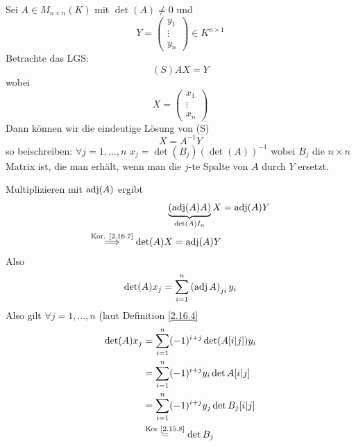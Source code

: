 \begin{subtheorem}
	Sei $ A \in M_{n \times n} (K) $ mit $ \det(A) \neq 0 $ 
	und
	\[
		Y = \begin{pmatrix} y_1 \\ \vdots \\ y_n \end{pmatrix} \in K^{n \times 1} 
	\]
	Betrachte das LGS:
	\[
		(S) AX = Y
	\]
	wobei
	\[
		X = \begin{pmatrix} x_1 \\ \vdots \\ x_n \end{pmatrix} 
	\]
	Dann können wir die eindeutige Lösung von (S)
	\[
		X = A^{-1} Y
	\]
	so beischreiben:
	$ \forall j = 1, \dotsc, n $ $ x_j = \det\left( B_j \right) \left( \det(A) \right) ^{-1}  $ 
	wobei $ B_j $ die $ n \times n $ Matrix ist, die man erhält, wenn man die $ j $-te Spalte von $ A $ durch $ Y $ ersetzt.
\end{subtheorem}
\begin{subproof*}
	Multiplizieren mit $ \operatorname{adj}(A) $ ergibt
	\begin{align*}
		\underbrace{\left( \operatorname{adj}(A) A \right)}_{\det(A) I_n} X &= \operatorname{adj}(A) Y \\
		\overset{\text{Kor. \ref{2.16.7}}}{\implies} \det(A) X = \operatorname{adj}(A) Y
	\end{align*}
	Also
	\[
		\det(A) x_j = \sum_{i=1}^{n} \left( \operatorname{adj} A \right) _{ji} y_i
	\]
	Also gilt $ \forall j = 1, \dotsc, n $ (laut Definition \ref{2.16.4}
	\begin{align*}
		\det(A) x_j &= \sum_{i=1}^{n} (-1)^{i + j} \det(A[i|j]) y_i \\
		~ &= \sum_{i=1}^{n} (-1)^{i + j} y_i \det A[i|j] \\
		~ &= \sum_{i=1}^{n} (-1)^{i + j} y_j \det B_j[i|j] \\
		~ &\overset{\text{Kor \ref{2.15.8}} }{=} \det B_j \\
	\end{align*}
	
\end{subproof*}


